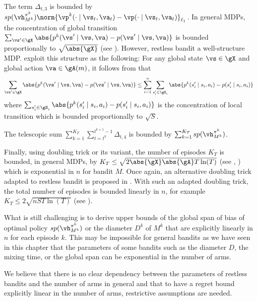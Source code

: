 The term $\Delta_{t,3}$ is bounded by $sp(\vh^{\pi^k}_{M^k})\norm{\vp^k(\cdot\mid \vs_t,\va_t)-\vp(\cdot\mid \vs_t,\va_t)}_{\ell_1}$.
In general MDPs, the concentration of global transition $\sum_{\vs'\in\gX} \abs{p^k(\vs'\mid \vs,\va) -p(\vs'\mid \vs,\va)}$ is bounded proportionally to $\sqrt{\abs{\gX}}$ (see \cite{qian2020concentration}).
However, restless bandit a well-structure MDP.
\cite{jung2019thompson, akbarzadeh2022learning} exploit this structure as the following:
For any global state $\vs\in\gX$ and global action $\va\in\gA(m)$, it follows from \cite[Lemma~13]{jung2019thompson} that
\begin{align*}
    \sum_{\vs'\in\gX} \abs{p^k(\vs'\mid \vs,\va) -p(\vs'\mid \vs,\va)}
    \le \sum_{i=1}^{n} \sum_{s'_i\in\gS_i} \abs{p^k(s'_i\mid s_i,a_i) -p(s'_i\mid s_i,a_i)}
\end{align*}
where $\sum_{s'_i\in\gS_i} \abs{p^k(s'_i\mid s_i,a_i) -p(s'_i\mid s_i,a_i)}$ is the concentration of local transition which is bounded proportionally to $\sqrt{S}$.

The telescopic sum $\sum_{k=1}^{K_T}\sum_{t=t^k}^{t^{k+1}-1} \Delta_{t,4}$ is bounded by $\sum_{k=1}^{K_T} sp(\vh^{\pi^k}_{M^k})$.

Finally, using doubling trick or its variant, the number of episodes $K_T$ is bounded, in general MDPs, by $K_T\le \sqrt{2\abs{\gX}\abs{\gA}T\ln(T)}$ (see \eg, \cite[Lemma~1]{ouyang2017learning}) which is exponential in $n$ for bandit $M$.
Once again, an alternative doubling trick adapted to restless bandit is proposed in \cite{ortner2012regret, jung2019thompson, akbarzadeh2022learning}.
With such an adapted doubling trick, the total number of episodes is bounded linearly in $n$, for example $K_T\le2\sqrt{nST\ln(T)}$ (see \cite[Lemma~A.1]{akbarzadeh2022learning}).

What is still challenging is to derive upper bounds of the global span of bias of optimal policy $sp(\vh^{\pi^k}_{M^k})$ or the diameter $D^k$ of $M^k$ that are explicitly linearly in $n$ for each episode $k$.
This may be impossible for general bandits as we have seen in this chapter that the parameters of some bandits such as the diameter $D$, the mixing time, or the global span can be exponential in the number of arms.

We believe that there is no clear dependency between the parameters of restless bandits and the number of arms in general and that to have a regret bound explicitly linear in the number of arms, restrictive assumptions are needed.

